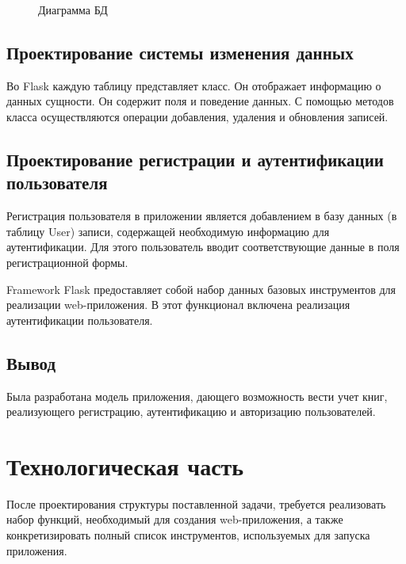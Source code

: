 \begin{figure}[h]
\caption{Диаграмма БД}
\label{fig:image}
\end{figure}


\subsection{Проектирование системы изменения данных}%
\setcounter{subsection}{2}

Во Flask каждую таблицу представляет класс. Он отображает информацию о данных сущности. Он содержит поля и поведение данных. 
С помощью методов класса осуществляются операции добавления, удаления и обновления записей.

\subsection{Проектирование регистрации и аутентификации пользователя}%
\setcounter{subsection}{3}

Регистрация пользователя в приложении является добавлением в базу данных (в таблицу User) записи, содержащей необходимую информацию для аутентификации. Для этого пользователь вводит соответствующие данные  в поля регистрационной формы.

Framework Flask предоставляет собой набор данных базовых инструментов для реализации web-приложения. В этот функционал включена реализация аутентификации пользователя.


\subsection{Вывод}%
\setcounter{subsection}{4}

Была разработана модель приложения, дающего возможность вести учет книг, реализующего регистрацию, аутентификацию и авторизацию пользователей.


\newpage
\section{Технологическая часть}%
\setcounter{section}{3}

После проектирования структуры поставленной задачи, требуется реализовать набор функций, необходимый для создания web-приложения, а также конкретизировать полный список инструментов, используемых для запуска приложения.

